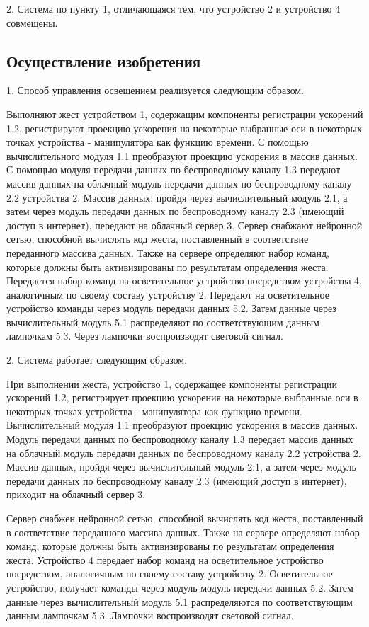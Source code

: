 
2. Система по пункту 1, отличающаяся тем, что устройство 2 и устройство 4 совмещены.

\subsection{Осуществление изобретения}  

1. Способ управления освещением реализуется следующим образом.

Выполняют жест устройством 1, содержащим компоненты регистрации ускорений 1.2, регистрируют проекцию ускорения на некоторые выбранные оси в некоторых точках устройства - манипулятора как функцию времени. С помощью вычислительного модуля 1.1 преобразуют проекцию ускорения в массив данных. С помощью модуля передачи данных по беспроводному каналу 1.3 передают массив данных на облачный модуль передачи данных по беспроводному каналу 2.2 устройства 2. Массив данных, пройдя через вычислительный модуль 2.1, а затем через модуль передачи данных по беспроводному каналу 2.3 (имеющий доступ в интернет), передают на облачный сервер 3. Сервер снабжают нейронной сетью, способной вычислять код жеста, поставленный в соответствие переданного массива данных. Также на сервере определяют набор команд, которые должны быть активизированы по результатам определения жеста. Передается набор команд на осветительное устройство посредством устройства 4, аналогичным по своему составу устройству 2. Передают на осветительное устройство команды через модуль передачи данных 5.2. Затем данные через вычислительный модуль 5.1 распределяют по соответствующим данным лампочкам 5.3. Через лампочки  воспроизводят световой сигнал.

2. Система работает следующим образом.

При выполнении жеста, устройство 1, содержащее компоненты регистрации ускорений 1.2, регистрирует проекцию ускорения на некоторые выбранные оси в некоторых точках устройства - манипулятора как функцию времени. Вычислительный модуля 1.1 преобразуют проекцию ускорения в массив данных. Модуль передачи данных по беспроводному каналу 1.3 передает массив данных на облачный модуль передачи данных по беспроводному каналу 2.2 устройства 2. Массив данных, пройдя через вычислительный модуль 2.1, а затем через модуль передачи данных по беспроводному каналу 2.3 (имеющий доступ в интернет), приходит на облачный сервер 3. 

Сервер снабжен нейронной сетью, способной вычислять код жеста, поставленный в соответствие переданного массива данных. Также на сервере определяют набор команд, которые должны быть активизированы по результатам определения жеста. Устройство 4 передает набор команд на осветительное устройство посредством, аналогичным по своему составу устройству 2. Осветительное устройство, получает команды через модуль модуль передачи данных 5.2. Затем данные через вычислительный модуль 5.1 распределяются по соответствующим данным лампочкам 5.3. Лампочки воспроизводят световой сигнал.
